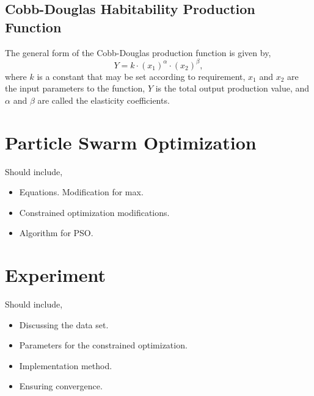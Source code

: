 \documentclass{article}
\newenvironment{pointers}{%
  \noindent Should include,
  \begin{itemize}
    \setlength{\itemsep}{-1pt}}{%
\end{itemize}}
\begin{document}
\subsection{Cobb-Douglas Habitability Production Function}
The general form of the Cobb-Douglas production function is given by,
\begin{equation}
  Y = k\cdot{(x_1)}^\alpha\cdot{(x_2)}^\beta,
\end{equation}
where $k$ is a constant that may be set according to requirement, $x_1$ and $x_2$ are the input parameters to the
function, $Y$ is the total output production value, and $\alpha$ and $\beta$ are called the elasticity coefficients.


  



\section{Particle Swarm Optimization}
\begin{pointers}
\item Equations. Modification for max.
\item Constrained optimization modifications.
\item Algorithm for PSO\@.
\end{pointers}


\section{Experiment}
\begin{pointers}
\item Discussing the data set.
\item Parameters for the constrained optimization.
\item Implementation method.
\item Ensuring convergence.
\end{pointers}
\end{document}
